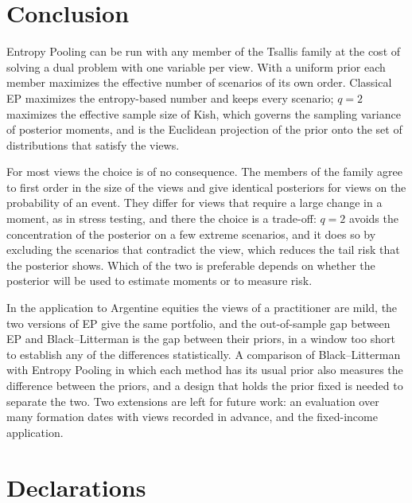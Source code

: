 \documentclass[11pt]{article}
\begin{document}
\section{Conclusion}\label{sec:conclusion}

Entropy Pooling can be run with any member of the Tsallis family at the
cost of solving a dual problem with one variable per view. With a uniform
prior each member maximizes the effective number of scenarios of its own
order. Classical EP maximizes the entropy-based number and keeps every
scenario; $q=2$ maximizes the effective sample size of Kish, which
governs the sampling variance of posterior moments, and is the Euclidean
projection of the prior onto the set of distributions that satisfy the
views.

For most views the choice is of no consequence. The members of the family
agree to first order in the size of the views and give identical posteriors
for views on the probability of an event. They differ for views that
require a large change in a moment, as in stress testing, and there the
choice is a trade-off: $q=2$ avoids the concentration of the posterior on a
few extreme scenarios, and it does so by excluding the scenarios that
contradict the view, which reduces the tail risk that the posterior shows.
Which of the two is preferable depends on whether the posterior will be
used to estimate moments or to measure risk.

In the application to Argentine equities the views of a practitioner are
mild, the two versions of EP give the same portfolio, and the out-of-sample
gap between EP and Black--Litterman is the gap between their priors, in a
window too short to establish any of the differences statistically. A
comparison of Black--Litterman with Entropy Pooling in which each method
has its usual prior also measures the difference between the priors, and a
design that holds the prior fixed is needed to separate the two. Two extensions are left for future
work: an evaluation over many formation dates with views recorded in
advance, and the fixed-income application.

\section*{Declarations}
\end{document}
